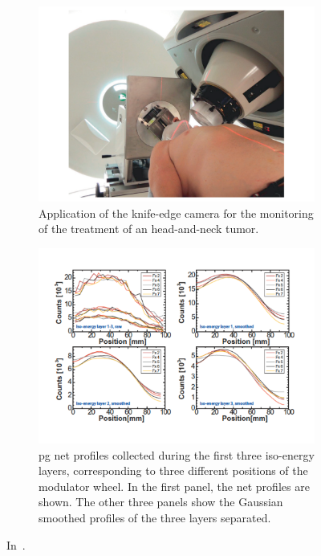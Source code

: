 \begin{figure}
\centering
\begin{subfigure}[t]{.49\textwidth}
\hspace{-0.7cm}\includegraphics[width=1.2\linewidth]{03_GraphicFiles/chapter2_GammaCameras/KE_IBA_clinical.pdf}
\caption{Application of the knife-edge camera for the monitoring of the treatment of an head-and-neck tumor.}
\label{chap2::fig::KE_IBA_clinical}
\end{subfigure}
\begin{subfigure}[t]{.49\textwidth}
\hspace{-0.7cm}\includegraphics[width=1.2\linewidth]{03_GraphicFiles/chapter2_GammaCameras/KE_IBA_clinResults.pdf}
\caption{\gls{pg} net profiles collected during the first three iso-energy layers, corresponding to three different positions of the modulator wheel. In the first panel, the net profiles are shown. The other three panels show the Gaussian smoothed profiles of the three layers separated.}
\label{chap2::fig::KE_IBA_clinical_results}
\end{subfigure}
\caption{In~\cite{Richter2016}.}
\label{chap2::fig::KE_IBA_clinTest}
\end{figure}

